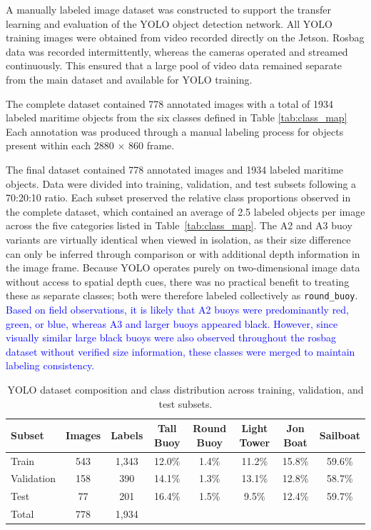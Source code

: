 \documentclass[../main.tex]{subfiles}
\begin{document}
A manually labeled image dataset was constructed to support the transfer learning and evaluation of the YOLO object detection network. 
All YOLO training images were obtained from video recorded directly on the Jetson.
Rosbag data was recorded intermittently, whereas the cameras operated and streamed continuously.
This ensured that a large pool of video data remained separate from the main dataset and available for YOLO training.

The complete dataset contained 778 annotated images with a total of 1934 labeled maritime objects from the six classes defined in Table \ref{tab:class_map} 
Each annotation was produced through a manual labeling process for objects present within each 2880 $\times$ 860 frame. 

The final dataset contained 778 annotated images and 1934 labeled maritime objects. 
Data were divided into training, validation, and test subsets following a 70:20:10 ratio.
Each subset preserved the relative class proportions observed in the complete dataset, which contained an average of 2.5 labeled objects per image across the five categories listed in Table~\ref{tab:class_map}.
The A2 and A3 buoy variants are virtually identical when viewed in isolation, as their size difference can only be inferred through comparison or with additional depth information in the image frame. 
Because YOLO operates purely on two-dimensional image data without access to spatial depth cues, there was no practical benefit to treating these as separate classes; both were therefore labeled collectively as \texttt{round\_buoy}.
\textcolor{blue}{Based on field observations, it is likely that A2 buoys were predominantly red, green, or blue, whereas A3 and larger buoys appeared black. 
However, since visually similar large black buoys were also observed throughout the rosbag dataset without verified size information, these classes were merged to maintain labeling consistency.}

\begin{table}[htbp]
\centering
\begin{tabular}{lccccccc}
\hline
Subset & Images & Labels & Tall Buoy & Round Buoy & Light Tower & Jon Boat & Sailboat \\
\hline
Train & 543 & 1,343 & 12.0\% & 1.4\% & 11.2\% & 15.8\% & 59.6\% \\
Validation & 158 & 390 & 14.1\% & 1.3\% & 13.1\% & 12.8\% & 58.7\% \\
Test & 77 & 201 & 16.4\% & 1.5\% & 9.5\% & 12.4\% & 59.7\% \\
\hline
Total & 778 & 1,934 &  &  &  &  &  \\
\hline
\end{tabular}
\caption{YOLO dataset composition and class distribution across training, validation, and test subsets.}
\label{table:yolo_data_split}
\end{table}
\end{document}
